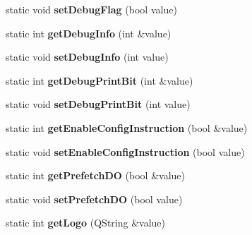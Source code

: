 \begin{DoxyCompactItemize}
\item 
\hypertarget{classAppConf_af57b988eaa5d765f0d1a168e3ee24ac7}{static void {\bfseries set\-Debug\-Flag} (bool value)}\label{classAppConf_af57b988eaa5d765f0d1a168e3ee24ac7}

\item 
\hypertarget{classAppConf_ae2720686365fe702b49615a7012008db}{static int {\bfseries get\-Debug\-Info} (int \&value)}\label{classAppConf_ae2720686365fe702b49615a7012008db}

\item 
\hypertarget{classAppConf_a90013817b20b83bc80b2a649384e1251}{static void {\bfseries set\-Debug\-Info} (int value)}\label{classAppConf_a90013817b20b83bc80b2a649384e1251}

\item 
\hypertarget{classAppConf_a10ffc80b58996ab524a90e6df9794d03}{static int {\bfseries get\-Debug\-Print\-Bit} (int \&value)}\label{classAppConf_a10ffc80b58996ab524a90e6df9794d03}

\item 
\hypertarget{classAppConf_ab51bf3b75a25d759676a5d30e7806645}{static void {\bfseries set\-Debug\-Print\-Bit} (int value)}\label{classAppConf_ab51bf3b75a25d759676a5d30e7806645}

\item 
\hypertarget{classAppConf_ac1e2307caac587c3fbc383dd22826cc9}{static int {\bfseries get\-Enable\-Config\-Instruction} (bool \&value)}\label{classAppConf_ac1e2307caac587c3fbc383dd22826cc9}

\item 
\hypertarget{classAppConf_af4f850c3cc88d81a067cf25f782c5c1f}{static void {\bfseries set\-Enable\-Config\-Instruction} (bool value)}\label{classAppConf_af4f850c3cc88d81a067cf25f782c5c1f}

\item 
\hypertarget{classAppConf_ad5af14f2dcc9e8a56d28101c57963f69}{static int {\bfseries get\-Prefetch\-D\-O} (bool \&value)}\label{classAppConf_ad5af14f2dcc9e8a56d28101c57963f69}

\item 
\hypertarget{classAppConf_a8a02789ea3061cd82729b4930ddc4cde}{static void {\bfseries set\-Prefetch\-D\-O} (bool value)}\label{classAppConf_a8a02789ea3061cd82729b4930ddc4cde}

\item 
\hypertarget{classAppConf_a8b92a887f4798cc52e8e69b2d3a9e9af}{static int {\bfseries get\-Logo} (Q\-String \&value)}\label{classAppConf_a8b92a887f4798cc52e8e69b2d3a9e9af}


\end{DoxyCompactItemize}
